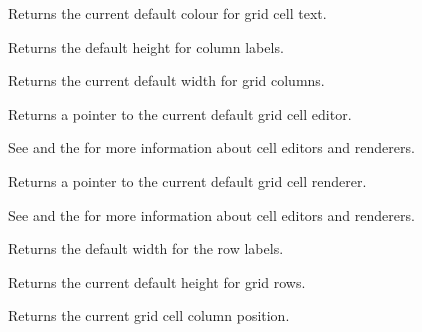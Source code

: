 
Returns the current default colour for grid cell text.

\label{wxgridgetdefaultcollabelsize}


Returns the default height for column labels.

\label{wxgridgetdefaultcolsize}


Returns the current default width for grid columns.

\label{wxgridgetdefaulteditor}


Returns a pointer to the current default grid cell editor.

See  and
the  for more information about cell editors and renderers.

\label{wxgridgetdefaultrenderer}


Returns a pointer to the current default grid cell renderer.

See  and
the  for more information about cell editors and renderers.

\label{wxgridgetdefaultrowlabelsize}


Returns the default width for the row labels.

\label{wxgridgetdefaultrowsize}


Returns the current default height for grid rows.

\label{wxgridgetgridcursorcol}


Returns the current grid cell column position.

